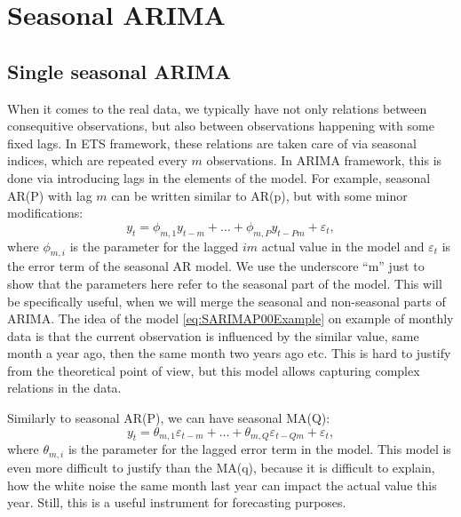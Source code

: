 \documentclass[
]{book}
\theoremstyle{definition}
\theoremstyle{definition}
\theoremstyle{definition}
\theoremstyle{definition}
\theoremstyle{remark}
\begin{document}
\hypertarget{seasonal-arima}{%
\section{Seasonal ARIMA}\label{seasonal-arima}}

\hypertarget{single-seasonal-arima}{%
\subsection{Single seasonal ARIMA}\label{single-seasonal-arima}}

When it comes to the real data, we typically have not only relations between consequitive observations, but also between observations happening with some fixed lags. In ETS framework, these relations are taken care of via seasonal indices, which are repeated every \(m\) observations. In ARIMA framework, this is done via introducing lags in the elements of the model. For example, seasonal AR(P) with lag \(m\) can be written similar to AR(p), but with some minor modifications:
\begin{equation}
  {y}_{t} = \phi_{m,1} y_{t-m} + \dots + \phi_{m,P} y_{t-Pm} + \varepsilon_t ,
  \label{eq:SARIMAP00Example}
\end{equation}
where \(\phi_{m,i}\) is the parameter for the lagged \(im\) actual value in the model and \(\varepsilon_t\) is the error term of the seasonal AR model. We use the underscore ``m'' just to show that the parameters here refer to the seasonal part of the model. This will be specifically useful, when we will merge the seasonal and non-seasonal parts of ARIMA. The idea of the model \eqref{eq:SARIMAP00Example} on example of monthly data is that the current observation is influenced by the similar value, same month a year ago, then the same month two years ago etc. This is hard to justify from the theoretical point of view, but this model allows capturing complex relations in the data.

Similarly to seasonal AR(P), we can have seasonal MA(Q):
\begin{equation}
    {y}_{t} = \theta_{m,1} \varepsilon_{t-m} + \dots + \theta_{m,Q} \varepsilon_{t-Qm} + \varepsilon_t ,
  \label{eq:SARIMA00QExample}
\end{equation}
where \(\theta_{m,i}\) is the parameter for the lagged error term in the model. This model is even more difficult to justify than the MA(q), because it is difficult to explain, how the white noise the same month last year can impact the actual value this year. Still, this is a useful instrument for forecasting purposes.
\end{document}
